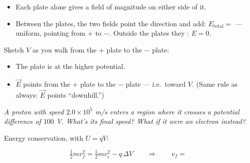 \documentclass[12pt]{article}
\begin{document}
\vspace{5.5cm}

\begin{itemize}[itemsep=6pt,parsep=3pt,topsep=3pt]
\item Each plate alone gives a field of magnitude \bl[3.5cm]
on either side of it.
\item Between the plates, the two fields point the \bl[2cm] direction and
add: $E_{\text{total}}=$ \bl[3cm] --- uniform, pointing from $+$ to $-$.
Outside the plates they \bl[2cm]: $E=0$.
\end{itemize}


Sketch $V$ as you walk from the $+$ plate to the $-$ plate:

\begin{center}
\end{center}

\begin{itemize}[itemsep=6pt,parsep=3pt,topsep=3pt]
\item The \bl[1.3cm] plate is at the higher potential.
\item $\vec E$ points from the $+$ plate to the $-$ plate --- i.e.\ toward
\bl[3cm] $V$. (Same rule as always: $\vec E$ points ``downhill.'')
\end{itemize}


\textit{A proton with speed $2.0\times10^5$ m/s enters a region where it
crosses a potential difference of $100$ V. What's its final speed? What if
it were an electron instead?}

Energy conservation, with $U=qV$:

\[
\tfrac12 m v_f^2 = \tfrac12 m v_i^2 - q\,\Delta V
\qquad\Longrightarrow\qquad
v_f =\
\]
\vspace{1.1cm}
\end{document}
